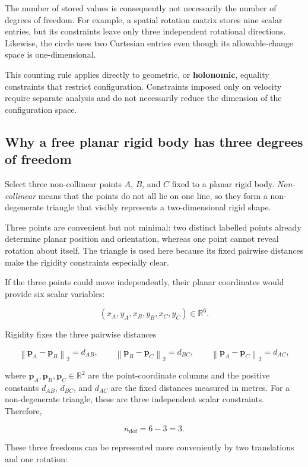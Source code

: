 \documentclass[
  australian,
  12pt,
  letterpaper,
  DIV=11,
  numbers=noendperiod,
  twoside]{scrreprt}
\begin{document}
The number of stored values is consequently not necessarily the number
of degrees of freedom. For example, a spatial rotation matrix stores
nine scalar entries, but its constraints leave only three independent
rotational directions. Likewise, the circle uses two Cartesian entries
even though its allowable-change space is one-dimensional.

This counting rule applies directly to geometric, or \textbf{holonomic},
equality constraints that restrict configuration. Constraints imposed
only on velocity require separate analysis and do not necessarily reduce
the dimension of the configuration space.

\subsection{Why a free planar rigid body has three degrees of
freedom}\label{why-a-free-planar-rigid-body-has-three-degrees-of-freedom}

Select three non-collinear points \(A\), \(B\), and \(C\) fixed to a
planar rigid body. \emph{Non-collinear} means that the points do not all
lie on one line, so they form a non-degenerate triangle that visibly
represents a two-dimensional rigid shape.

Three points are convenient but not minimal: two distinct labelled
points already determine planar position and orientation, whereas one
point cannot reveal rotation about itself. The triangle is used here
because its fixed pairwise distances make the rigidity constraints
especially clear.

If the three points could move independently, their planar coordinates
would provide six scalar variables:

\[
(x_A,y_A,x_B,y_B,x_C,y_C)
\in
\mathbb R^6.
\]

Rigidity fixes the three pairwise distances

\[
\left\|\mathbf p_A-\mathbf p_B\right\|_2=d_{AB},
\qquad
\left\|\mathbf p_B-\mathbf p_C\right\|_2=d_{BC},
\qquad
\left\|\mathbf p_A-\mathbf p_C\right\|_2=d_{AC},
\]

where \(\mathbf p_A,\mathbf p_B,\mathbf p_C\in\mathbb R^2\) are the
point-coordinate columns and the positive constants \(d_{AB}\),
\(d_{BC}\), and \(d_{AC}\) are the fixed distances measured in metres.
For a non-degenerate triangle, these are three independent scalar
constraints. Therefore,

\[
n_{\mathrm{dof}}
=
6-3
=
3.
\]

These three freedoms can be represented more conveniently by two
translations and one rotation:
\end{document}
